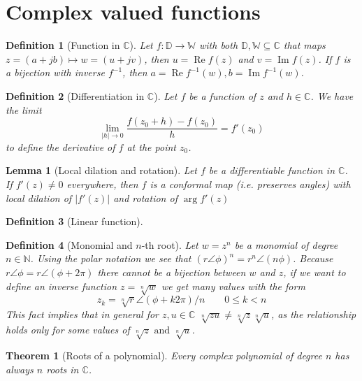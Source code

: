 \documentclass[twocolumn, margin=normal]{tex/hsrzf}
\newcommand\Nset{\mathbb{N}}
\newcommand\Cset{\mathbb{C}}
\newcommand\len[1]{\lvert#1\rvert}
\renewcommand\Re{\operatorname{Re}}
\renewcommand\Im{\operatorname{Im}}
\theoremstyle{komfourzf}
\newtheorem{theorem}{Theorem}
\newtheorem{definition}{Definition}
\newtheorem{lemma}{Lemma}
\begin{document}
\section{Complex valued functions}

\begin{definition}[Function in \(\Cset\)]
  Let \(f: \mathbb{D} \to \mathbb{W}\) with both \(\mathbb{D}, \mathbb{W} \subseteq \Cset\) 
  that maps \(z = (a + jb) \mapsto w = (u + jv)\),
  then \(u = \Re f(z)\) and \(v = \Im f(z)\).
  If \(f\) is a bijection with inverse \(f^{-1}\), then \(a = \Re f^{-1}(w), b = \Im f^{-1}(w)\).
\end{definition}

\begin{definition}[Differentiation in \(\Cset\)]
  Let \(f\) be a function of \(z\) and \(h \in \Cset\). We have the limit
  \[
    \lim_{\len{h} \to 0} \frac{f(z_0 + h) - f(z_0)}{h} = f'(z_0)
  \]
  to define the \emph{derivative} of \(f\) at the point \(z_0\).
\end{definition}

\begin{lemma}[Local dilation and rotation]
  Let \(f\) be a differentiable function in \(\Cset\).
  If \(f'(z) \neq 0\) everywhere, then \(f\) is a conformal map (i.e. preserves angles) with local dilation of \(\len{f'(z)}\) and rotation of \(\arg f'(z)\)
\end{lemma}

\begin{definition}[Linear function]

\end{definition}

\begin{definition}[Monomial and \(n\)-th root]
  Let \(w = z^n\) be a monomial of degree \(n\in\Nset\). Using the polar notation we see that
  \((r\angle \phi)^n = r^n \angle (n\phi)\). Because \(r\angle\phi = r\angle(\phi+2\pi)\) there cannot be a bijection between \(w\) and \(z\), if we want to define an inverse function \(z = \sqrt[n]{w}\) we get many values with the form
  \[
    z_k = \sqrt[n]{r}\angle(\phi + k2\pi)/n \qquad 0 \leq k < n
  \]
  This fact implies that in general for \(z,u \in\Cset\) \(\sqrt[n]{zu} \neq \sqrt[n]{z}\sqrt[n]{u}\), as the relationship holds only for \emph{some} values of \(\sqrt[n]{z} \text{ and } \sqrt[n]{u}\).
\end{definition}

\begin{theorem}[Roots of a polynomial]
  Every complex polynomial of degree \(n\) has always \(n\) roots in \(\Cset\).
\end{theorem}
\end{document}
